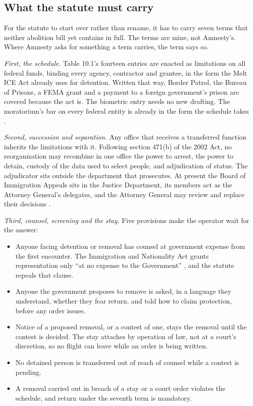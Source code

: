 \subsection{What the statute must carry}
\label{sec:10.4.5}
For the statute to start over rather than rename, it has to carry seven terms that neither abolition bill yet contains in full. The terms are mine, not Amnesty's. Where Amnesty asks for something a term carries, the term says so.

\emph{First, the schedule.} Table 10.1's fourteen entries are enacted as limitations on all federal funds, binding every agency, contractor and grantee, in the form the Melt ICE Act already uses for detention. Written that way, Border Patrol, the Bureau of Prisons, a FEMA grant and a payment to a foreign government's prison are covered because the act is. The biometric entry needs no new drafting. The moratorium's bar on every federal entity is already in the form the schedule takes \autocite{Jayapal2026Moratorium}.

\emph{Second, succession and separation.} Any office that receives a transferred function inherits the limitations with it. Following section 471(b) of the 2002 Act, no reorganization may recombine in one office the power to arrest, the power to detain, custody of the data used to select people, and adjudication of status. The adjudicator sits outside the department that prosecutes. At present the Board of Immigration Appeals sits in the Justice Department, its members act as the Attorney General's delegates, and the Attorney General may review and replace their decisions \autocite{cfr1003_1}.

\emph{Third, counsel, screening and the stay.} Five provisions make the operator wait for the answer:

\begin{itemize}
\item Anyone facing detention or removal has counsel at government expense from the first encounter. The Immigration and Nationality Act grants representation only “at no expense to the Government” \autocite{usc1362}, and the statute repeals that clause.
\item Anyone the government proposes to remove is asked, in a language they understand, whether they fear return, and told how to claim protection, before any order issues.
\item Notice of a proposed removal, or a contest of one, stays the removal until the contest is decided. The stay attaches by operation of law, not at a court's discretion, so no flight can leave while an order is being written.
\item No detained person is transferred out of reach of counsel while a contest is pending.
\item A removal carried out in breach of a stay or a court order violates the schedule, and return under the seventh term is mandatory.
\end{itemize}

